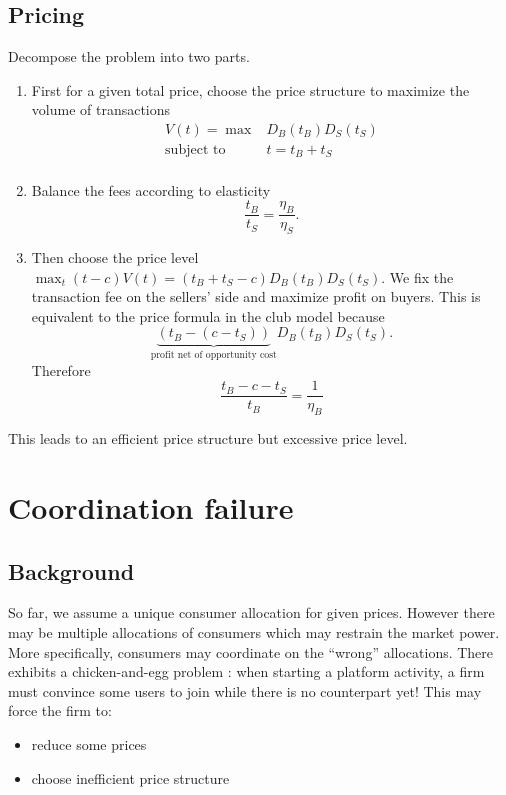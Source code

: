 \subsection{Pricing}
Decompose the problem into two parts.
\begin{enumerate}
    \item First for a given total price, choose the price structure to maximize the volume of transactions \begin{equation*}
        \begin{array}{rl}
            V(t)=\max & D_B(t_B)D_S(t_S)\\
             \text{subject to}& t=t_B+t_S\\
        \end{array}
    \end{equation*}
    \item Balance the fees according to elasticity \begin{equation*}
        \frac{t_B}{t_S}=\frac{\eta_B}{\eta_S}.
    \end{equation*}
    \item Then choose the price level $\max_t (t-c)V(t)=(t_B+t_S-c) D_B(t_B)D_S(t_S)$. We fix the transaction fee on the sellers’ side and maximize profit on buyers. This is equivalent to the price formula in the club model because \begin{equation*}
        \underbrace{(t_B-(c-t_S))}_\text{profit net of opportunity cost} D_B(t_B)D_S(t_S).
    \end{equation*} Therefore \begin{equation*}
        \frac{t_B-c-t_S}{t_B}= \frac{1}{\eta_B}
    \end{equation*}
\end{enumerate}
\begin{remark}
    This leads to an efficient price structure but excessive price level.
\end{remark}
\section{Coordination failure}
\subsection{Background}
So far, we assume a unique consumer allocation for given prices. However there may be multiple allocations of consumers which may restrain the market power. More specifically, consumers may coordinate on the ``wrong'' allocations. There exhibits a chicken-and-egg problem : when starting a platform activity, a firm must convince some users to join while there is no counterpart yet! This may force the firm to: \begin{itemize}
    \item reduce some prices
    \item choose inefficient price structure
\end{itemize}

